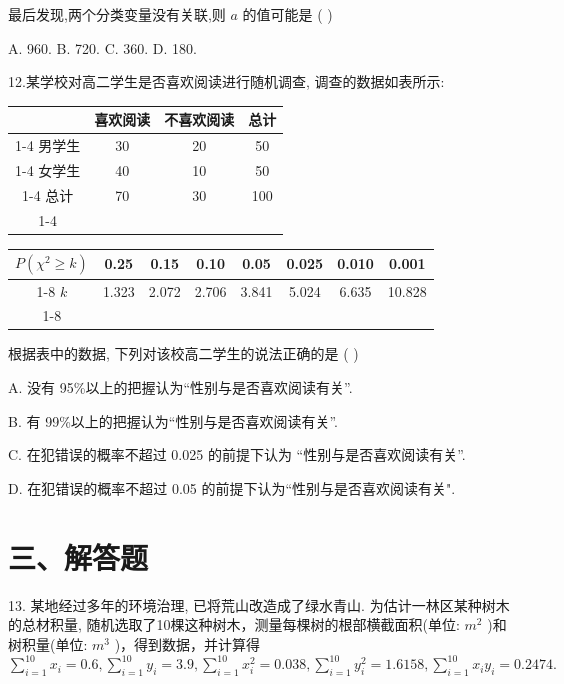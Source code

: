 最后发现,两个分类变量没有关联,则 $a$ 的值可能是 ( )

A. 960. B. 720. C. 360. D. 180.

12.某学校对高二学生是否喜欢阅读进行随机调查, 调查的数据如表所示:

\begin{center}
\begin{tabular}{|c|c|c|c|}
\hline
\phantom{X} & 喜欢阅读 & 不喜欢阅读 & 总计 \\
\cline{1-4}
男学生 & 30 & 20 & 50 \\
\cline{1-4}
女学生 & 40 & 10 & 50 \\
\cline{1-4}
总计 & 70 & 30 & 100 \\
\cline{1-4}
\hline
\end{tabular}
\end{center}

\begin{center}
\begin{tabular}{|c|c|c|c|c|c|c|c|}
\hline
$P\left( {{\chi }^{2} \geq  k}\right)$ & 0.25 & 0.15 & 0.10 & 0.05 & 0.025 & 0.010 & 0.001 \\
\cline{1-8}
$k$ & 1.323 & 2.072 & 2.706 & 3.841 & 5.024 & 6.635 & 10.828 \\
\cline{1-8}
\hline
\end{tabular}
\end{center}

根据表中的数据, 下列对该校高二学生的说法正确的是 ( )

A. 没有 95\%以上的把握认为“性别与是否喜欢阅读有关”.

B. 有 99\%以上的把握认为“性别与是否喜欢阅读有关”.

C. 在犯错误的概率不超过 0.025 的前提下认为 “性别与是否喜欢阅读有关”.

D. 在犯错误的概率不超过 0.05 的前提下认为“性别与是否喜欢阅读有关".

\section*{三、解答题}

13. 某地经过多年的环境治理, 已将荒山改造成了绿水青山. 为估计一林区某种树木的总材积量, 随机选取了10棵这种树木，测量每棵树的根部横截面积(单位: ${{m}}^{2}$ )和树积量(单位: ${{m}}^{3}$ )，得到数据，并计算得 $\mathop{\sum }\limits_{{i = 1}}^{{10}}{x}_{i} = {0.6},\mathop{\sum }\limits_{{i = 1}}^{{10}}{y}_{i} = {3.9},\mathop{\sum }\limits_{{i = 1}}^{{10}}{x}_{i}^{2} = {0.038},\mathop{\sum }\limits_{{i = 1}}^{{10}}{y}_{i}^{2} = {1.6158},\mathop{\sum }\limits_{{i = 1}}^{{10}}{x}_{i}{y}_{i} = {0.2474}.$

